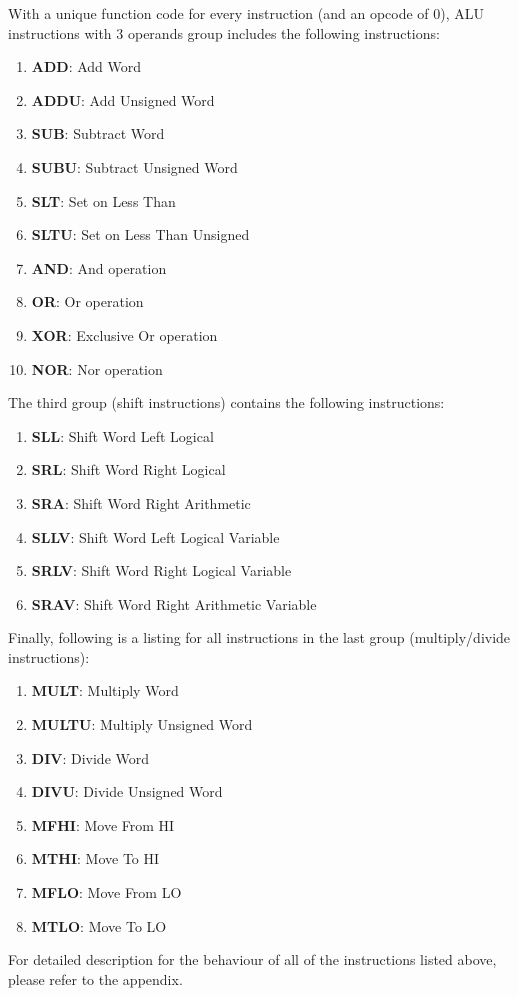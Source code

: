 \documentclass[oneside]{book}
\begin{document}
\begin{itemize}
With a unique function code for every instruction (and an opcode of 0),
ALU instructions with 3 operands group includes the following instructions:

\begin{enumerate}

\item \textbf{ADD}:  Add Word
\item \textbf{ADDU}: Add Unsigned Word
\item \textbf{SUB}:  Subtract Word
\item \textbf{SUBU}: Subtract Unsigned Word
\item \textbf{SLT}:  Set on Less Than
\item \textbf{SLTU}: Set on Less Than Unsigned
\item \textbf{AND}:  And operation
\item \textbf{OR}:   Or operation
\item \textbf{XOR}:  Exclusive Or operation
\item \textbf{NOR}:  Nor operation

\end{enumerate}

The third group (shift instructions) contains the following instructions:

\begin{enumerate}

\item \textbf{SLL}:  Shift Word Left Logical
\item \textbf{SRL}:  Shift Word Right Logical
\item \textbf{SRA}:  Shift Word Right Arithmetic
\item \textbf{SLLV}: Shift Word Left Logical Variable
\item \textbf{SRLV}: Shift Word Right Logical Variable
\item \textbf{SRAV}: Shift Word Right Arithmetic Variable

\end{enumerate}

Finally, following is a listing for all instructions in the last
group (multiply/divide instructions):

\begin{enumerate}

\item \textbf{MULT}:  Multiply Word
\item \textbf{MULTU}: Multiply Unsigned Word
\item \textbf{DIV}:   Divide Word
\item \textbf{DIVU}:  Divide Unsigned Word
\item \textbf{MFHI}:  Move From HI
\item \textbf{MTHI}:  Move To HI
\item \textbf{MFLO}:  Move From LO
\item \textbf{MTLO}:  Move To LO

\end{enumerate}

For detailed description for the behaviour of all of the instructions listed
above, please refer to the appendix.

\end{itemize}
\end{document}
